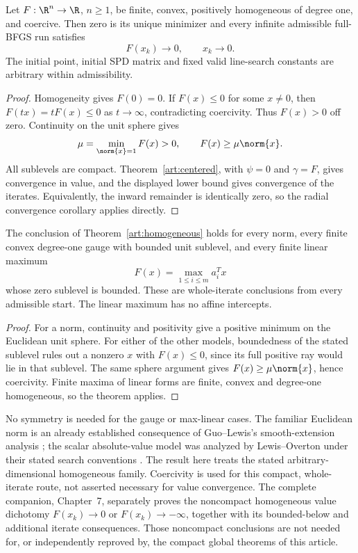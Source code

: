 \begin{theorem}\label{art:homogeneous}
Let $F:\R^n\to\R$, $n\ge1$, be finite, convex, positively homogeneous of
degree one, and coercive. Then zero is its unique minimizer and every
infinite admissible full-BFGS run satisfies
\[
 F(x_k)\longrightarrow0,\qquad x_k\longrightarrow0.
\]
The initial point, initial SPD matrix and fixed valid line-search constants
are arbitrary within admissibility.
\end{theorem}
\begin{proof}
Homogeneity gives $F(0)=0$. If $F(x)\le0$ for some $x\ne0$, then
$F(tx)=tF(x)\le0$ as $t\to\infty$, contradicting coercivity. Thus
$F(x)>0$ off zero. Continuity on the unit sphere gives
\[
 \mu=\min_{\norm{x}=1}F(x)>0,
 \qquad F(x)\ge\mu\norm{x}.
\]
All sublevels are compact. Theorem~\ref{art:centered}, with $\psi=0$ and
$\gamma=F$, gives convergence in value, and the displayed lower bound gives
convergence of the iterates. Equivalently, the inward remainder is identically
zero, so the radial convergence corollary applies directly.
\end{proof}

\begin{corollary}\label{art:homogeneous-examples}
The conclusion of Theorem~\ref{art:homogeneous} holds for every norm, every
finite convex degree-one gauge with bounded unit sublevel, and every finite
linear maximum
\[
 F(x)=\max_{1\le i\le m}a_i^Tx
\]
whose zero sublevel is bounded. These are whole-iterate conclusions from every
admissible start. The linear maximum has no affine intercepts.
\end{corollary}
\begin{proof}
For a norm, continuity and positivity give a positive minimum on the Euclidean
unit sphere. For either of the other models, boundedness of the stated
sublevel rules out a nonzero $x$ with $F(x)\le0$, since its full positive ray
would lie in that sublevel. The same sphere argument gives
$F(x)\ge\mu\norm{x}$, hence coercivity. Finite maxima of linear forms are
finite, convex and degree-one homogeneous, so the theorem applies.
\end{proof}

No symmetry is needed for the gauge or max-linear cases. The familiar
Euclidean norm is an already established consequence of Guo--Lewis's
smooth-extension analysis \cite[Corollary~4.2]{GL18}; the scalar absolute-value
model was analyzed by Lewis--Overton under their stated search conventions
\cite[Section~5.1]{LO}. The result here treats the stated arbitrary-dimensional
homogeneous family. Coercivity is used for this compact, whole-iterate route,
not asserted necessary for value convergence. The complete companion,
Chapter~7, separately proves the noncompact homogeneous value dichotomy
$F(x_k)\to0$ or $F(x_k)\to-\infty$, together with its bounded-below and
additional iterate consequences. Those noncompact conclusions are not needed
for, or independently reproved by, the compact global theorems of this article.
